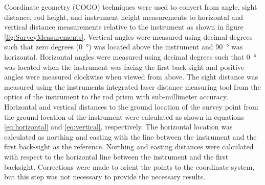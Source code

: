 Coordinate geometry (COGO) techniques were used to convert from angle, sight distance, rod height, and instrument height measurements to horizontal and vertical distance measurements relative to the instrument as shown in figure \ref{fig:SurveyMeasurements}.  Vertical angles were measured using decimal degrees such that zero degrees (\SI{0}{\degree}) was located above the instrument and \SI{90}{\degree} was horizontal.  Horizontal angles were measured using decimal degrees such that \SI{0}{\degree} was located when the instrument was facing the first back-sight and positive angles were measured clockwise when viewed from above.  The sight distance was measured using the instruments integrated laser distance measuring tool from the optics of the instrument to the rod prism with sub-millimeter accuracy.  Horizontal and vertical distances to the ground location of the survey point from the ground location of the instrument were calculated as shown in equations \ref{eq:horizontal} and \ref{eq:vertical}, respectively.  The horizontal location was calculated as northing and easting with the line between the instrument and the first back-sight as the reference.  Northing and easting distances were calculated with respect to the horizontal line between the instrument and the first backsight.  Corrections were made to orient the points to the coordinate system, but this step was not necessary to provide the necessary results. %

